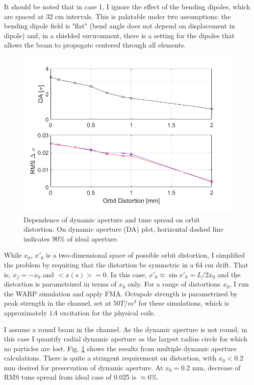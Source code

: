 It should be noted that in case 1, I ignore the effect of the bending dipoles, which are spaced at 32 cm intervals. This is palatable under two assumptions: the bending dipole field is "flat" (bend angle does not depend on displacement in dipole) and, in a shielded environment, there is a setting for the dipoles that allows the beam to propogate centered through all elements. 

\begin{figure}
\centering
\includegraphics[width=0.8 \textwidth]{7.figures/steeringtolerance/DA_deltanu_plots_vs_orbit_distortion.png}
\caption{Dependence of dynamic aperture and tune spread on orbit distortion. On dynamic aperture (DA) plot, horizontal dashed line indicates $90\%$ of ideal aperture.}
\label{fig:DAvsorbitdistort}
\end{figure}

While $x_0$, $x'_0$ is a two-dimensional space of possible orbit distortion, I simplified the problem by requiring that the distortion be symmetric in a 64 cm drift. That is, $x_f = -x_0$ and $<x(s)> = 0$. In this case, $x'_0 \approx \sin{x'_0} = L/2x_0$ and the distortion is parametrized in terms of $x_0$ only. For a range of distortions $x_0$, I run the WARP simulation and apply FMA. Octupole strength is parametrized by peak strength in the channel, set at $50 T/m^3$ for these simulations, which is approximately $1 A$ excitation for the physical coils. 
 
I assume a round beam in the channel. As the dynamic aperture is not round, in this case I quantify radial dynamic aperture as the largest radius circle for which no particles are lost. Fig. \ref{fig:DAvsorbitdistort} shows the results from multiple dynamic aperture calculations. There is quite a stringent requirement on distortion, with $x_0 < 0.2$ mm desired for preservation of dynamic aperture. At $x_0 = 0.2$ mm, decrease of RMS tune spread from ideal case of 0.025 is $\approx 6\%$.




